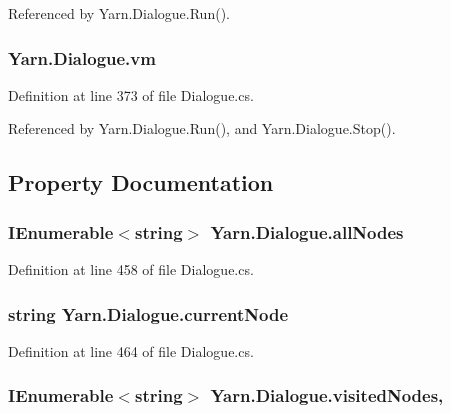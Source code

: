 Referenced by Yarn.\-Dialogue.\-Run().

\hypertarget{a00082_a8c1319357a9df6cff051328fb33224c7}{
\subsubsection[{vm}]{ Yarn.\-Dialogue.\-vm\hspace{0.3cm}{\ttfamily [private]}}}\label{a00082_a8c1319357a9df6cff051328fb33224c7}


Definition at line 373 of file Dialogue.\-cs.



Referenced by Yarn.\-Dialogue.\-Run(), and Yarn.\-Dialogue.\-Stop().



\subsection{Property Documentation}
\hypertarget{a00082_a0ee573e3d072bccf98ba1d975612d42c}{
\subsubsection[{all\-Nodes}]{\setlength{\rightskip}{0pt plus 5cm}I\-Enumerable$<$string$>$ Yarn.\-Dialogue.\-all\-Nodes\hspace{0.3cm}{\ttfamily [get]}}}\label{a00082_a0ee573e3d072bccf98ba1d975612d42c}


Definition at line 458 of file Dialogue.\-cs.

\hypertarget{a00082_af368b5c342d585dc6953876c5965ccc8}{
\subsubsection[{current\-Node}]{\setlength{\rightskip}{0pt plus 5cm}string Yarn.\-Dialogue.\-current\-Node\hspace{0.3cm}{\ttfamily [get]}}}\label{a00082_af368b5c342d585dc6953876c5965ccc8}


Definition at line 464 of file Dialogue.\-cs.

\hypertarget{a00082_ac5661051e0b7f44527fe526c7766dbbf}{
\subsubsection[{visited\-Nodes}]{\setlength{\rightskip}{0pt plus 5cm}I\-Enumerable$<$string$>$ Yarn.\-Dialogue.\-visited\-Nodes\hspace{0.3cm}{\ttfamily [get]}, {\ttfamily [set]}}}\label{a00082_ac5661051e0b7f44527fe526c7766dbbf}


